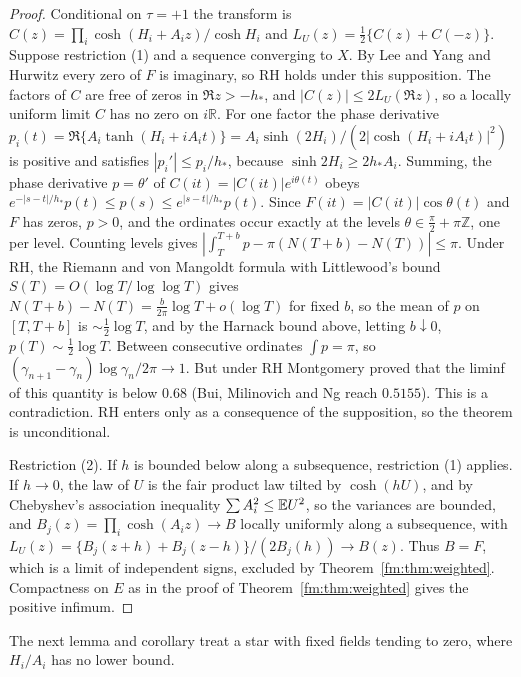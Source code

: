 \begin{proof}
Conditional on $\tau=+1$ the transform is $C(z)=\prod_i\cosh(H_i+A_iz)/\cosh H_i$ and $L_U(z)=\frac12\{C(z)+C(-z)\}$. Suppose restriction (1) and a sequence converging to $X$. By Lee and Yang and Hurwitz every zero of $F$ is imaginary, so RH holds under this supposition. The factors of $C$ are free of zeros in $\Re z>-h_*$, and $|C(z)|\le2L_U(\Re z)$, so a locally uniform limit $C$ has no zero on $i\mathbb R$. For one factor the phase derivative $p_i(t)=\Re\{A_i\tanh(H_i+iA_it)\}=A_i\sinh(2H_i)/(2|\cosh(H_i+iA_it)|^2)$ is positive and satisfies $|p_i'|\le p_i/h_*$, because $\sinh2H_i\ge2h_*A_i$. Summing, the phase derivative $p=\theta'$ of $C(it)=|C(it)|e^{i\theta(t)}$ obeys $e^{-|s-t|/h_*}p(t)\le p(s)\le e^{|s-t|/h_*}p(t)$. Since $F(it)=|C(it)|\cos\theta(t)$ and $F$ has zeros, $p>0$, and the ordinates occur exactly at the levels $\theta\in\frac\pi2+\pi\mathbb Z$, one per level. Counting levels gives $|\int_T^{T+b}p-\pi(N(T+b)-N(T))|\le\pi$. Under RH, the Riemann and von Mangoldt formula with Littlewood's bound $S(T)=O(\log T/\log\log T)$ %
gives $N(T+b)-N(T)=\frac b{2\pi}\log T+o(\log T)$ for fixed $b$, so the mean of $p$ on $[T,T+b]$ is $\sim\frac12\log T$, and by the Harnack bound above, letting $b\downarrow0$, $p(T)\sim\frac12\log T$. Between consecutive ordinates $\int p=\pi$, so $(\gamma_{n+1}-\gamma_n)\log\gamma_n/2\pi\to1$. But under RH Montgomery \cite{Montgomery73} proved that the liminf of this quantity is below $0.68$ (Bui, Milinovich and Ng reach $0.5155$). %
This is a contradiction. RH enters only as a consequence of the supposition, so the theorem is unconditional.

Restriction (2). If $h$ is bounded below along a subsequence, restriction (1) applies. If $h\to0$, the law of $U$ is the fair product law tilted by $\cosh(hU)$, and by Chebyshev's association inequality $\sum A_i^2\le\mathbb{E} U^2$, so the variances are bounded, and $B_j(z)=\prod_i\cosh(A_iz)\to B$ locally uniformly along a subsequence, with $L_U(z)=\{B_j(z+h)+B_j(z-h)\}/(2B_j(h))\to B(z)$. Thus $B=F$, which is a limit of independent signs, excluded by Theorem~\ref{fm:thm:weighted}. Compactness on $E$ as in the proof of Theorem~\ref{fm:thm:weighted} gives the positive infimum.
\end{proof}

The next lemma and corollary treat a star with fixed fields tending to zero, where $H_i/A_i$ has no lower bound.

